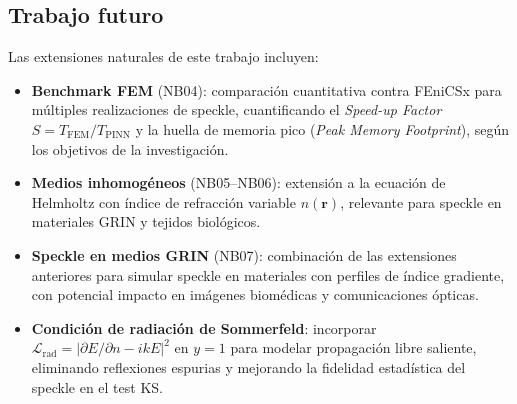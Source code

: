 \subsection*{Trabajo futuro}

Las extensiones naturales de este trabajo incluyen:

\begin{itemize}
  \item \textbf{Benchmark FEM} (NB04): comparación cuantitativa contra FEniCSx para
    múltiples realizaciones de speckle, cuantificando el \textit{Speed-up Factor}
    $S = T_{\mathrm{FEM}} / T_{\mathrm{PINN}}$ \citep{Thuerey2021_PBDL} y la
    huella de memoria pico (\textit{Peak Memory Footprint}), según los objetivos
    de la investigación.

  \item \textbf{Medios inhomogéneos} (NB05--NB06): extensión a la ecuación de Helmholtz
    con índice de refracción variable $n(\mathbf{r})$, relevante para speckle en
    materiales GRIN y tejidos biológicos.

  \item \textbf{Speckle en medios GRIN} (NB07): combinación de las extensiones anteriores
    para simular speckle en materiales con perfiles de índice gradiente,
    con potencial impacto en imágenes biomédicas y comunicaciones ópticas.

  \item \textbf{Condición de radiación de Sommerfeld}: incorporar
    $\mathcal{L}_{\mathrm{rad}} = |\partial E/\partial n - ikE|^2$
    en $y = 1$ para modelar propagación libre saliente, eliminando reflexiones espurias
    y mejorando la fidelidad estadística del speckle en el test KS.
\end{itemize}
